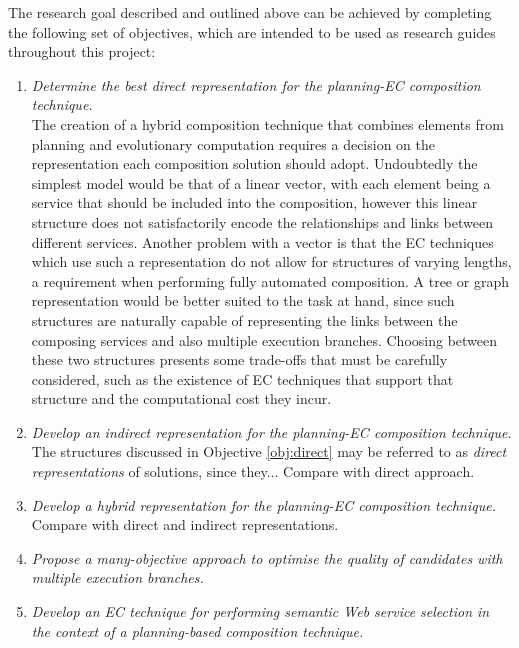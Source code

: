 \begin{enumerate}[(i)]
The research goal described and outlined above can be achieved by completing the following set of objectives, which are intended to be used as research guides throughout this project:

\begin{enumerate}
 \item \label{obj:direct} \textit{Determine the best direct representation for the planning-EC composition technique.}\\
 The creation of a hybrid composition technique that combines elements from planning and evolutionary computation requires a decision on the representation each composition solution should adopt. Undoubtedly the simplest model would be that of a linear vector, with each element being a service that should be included into the composition, however this linear structure does not satisfactorily encode the relationships and links between different services. Another problem with a vector is that the EC techniques which use such a representation do not allow for structures of varying lengths, a requirement when performing fully automated composition. A tree or graph representation would be better suited to the task at hand, since such structures are naturally capable of representing the links between the composing services and also multiple execution branches. Choosing between these two structures presents some trade-offs that must be carefully considered, such as the existence of EC techniques that support that structure and the computational cost they incur.
 
 \item \label{obj:indirect} \textit{Develop an indirect representation for the planning-EC composition technique.}\\
 The structures discussed in Objective \ref{obj:direct} may be referred to as \textit{direct representations} of solutions, since they...
 Compare with direct approach.
 
 \item \label{obj:hybrid} \textit{Develop a hybrid representation for the planning-EC composition technique.}\\
 Compare with direct and indirect representations.
 
 \item \label{obj:mo} \textit{Propose a many-objective approach to optimise the quality of candidates with multiple execution branches.}\\
 
 \item \label{obj:semantic} \textit{Develop an EC technique for performing semantic Web service selection in the context of a planning-based composition technique.}\\
 

\end{enumerate}
\end{enumerate}
